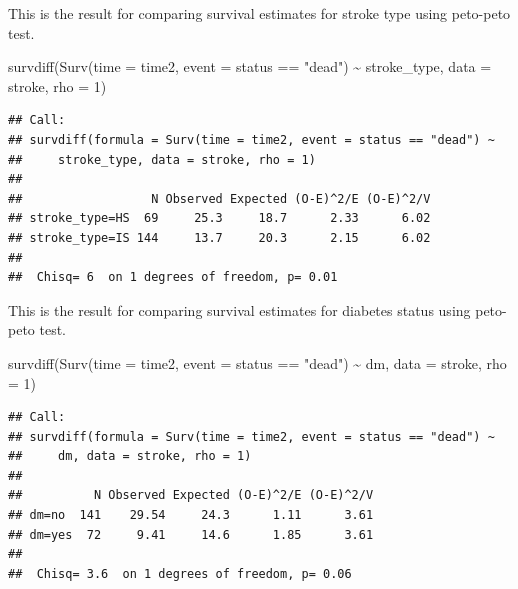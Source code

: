 \documentclass[
  10pt,
]{krantz}
\newenvironment{Shaded}{\begin{snugshade}}{\end{snugshade}}
\newcommand{\AttributeTok}[1]{\textcolor[rgb]{0.77,0.63,0.00}{#1}}
\newcommand{\DecValTok}[1]{\textcolor[rgb]{0.00,0.00,0.81}{#1}}
\newcommand{\FunctionTok}[1]{\textcolor[rgb]{0.00,0.00,0.00}{#1}}
\newcommand{\NormalTok}[1]{#1}
\newcommand{\SpecialCharTok}[1]{\textcolor[rgb]{0.00,0.00,0.00}{#1}}
\newcommand{\StringTok}[1]{\textcolor[rgb]{0.31,0.60,0.02}{#1}}
\begin{document}
This is the result for comparing survival estimates for stroke type using peto-peto test.

\begin{Shaded}
\begin{Highlighting}[]
\FunctionTok{survdiff}\NormalTok{(}\FunctionTok{Surv}\NormalTok{(}\AttributeTok{time =}\NormalTok{ time2, }
              \AttributeTok{event =}\NormalTok{ status }\SpecialCharTok{==} \StringTok{"dead"}\NormalTok{) }\SpecialCharTok{\textasciitilde{}}\NormalTok{ stroke\_type, }
         \AttributeTok{data =}\NormalTok{ stroke,}
         \AttributeTok{rho =} \DecValTok{1}\NormalTok{)}
\end{Highlighting}
\end{Shaded}

\begin{verbatim}
## Call:
## survdiff(formula = Surv(time = time2, event = status == "dead") ~ 
##     stroke_type, data = stroke, rho = 1)
## 
##                  N Observed Expected (O-E)^2/E (O-E)^2/V
## stroke_type=HS  69     25.3     18.7      2.33      6.02
## stroke_type=IS 144     13.7     20.3      2.15      6.02
## 
##  Chisq= 6  on 1 degrees of freedom, p= 0.01
\end{verbatim}

This is the result for comparing survival estimates for diabetes status using peto-peto test.

\begin{Shaded}
\begin{Highlighting}[]
\FunctionTok{survdiff}\NormalTok{(}\FunctionTok{Surv}\NormalTok{(}\AttributeTok{time =}\NormalTok{ time2, }
              \AttributeTok{event =}\NormalTok{ status }\SpecialCharTok{==} \StringTok{"dead"}\NormalTok{) }\SpecialCharTok{\textasciitilde{}}\NormalTok{ dm, }
         \AttributeTok{data =}\NormalTok{ stroke,}
         \AttributeTok{rho =} \DecValTok{1}\NormalTok{)}
\end{Highlighting}
\end{Shaded}

\begin{verbatim}
## Call:
## survdiff(formula = Surv(time = time2, event = status == "dead") ~ 
##     dm, data = stroke, rho = 1)
## 
##          N Observed Expected (O-E)^2/E (O-E)^2/V
## dm=no  141    29.54     24.3      1.11      3.61
## dm=yes  72     9.41     14.6      1.85      3.61
## 
##  Chisq= 3.6  on 1 degrees of freedom, p= 0.06
\end{verbatim}
\end{document}
